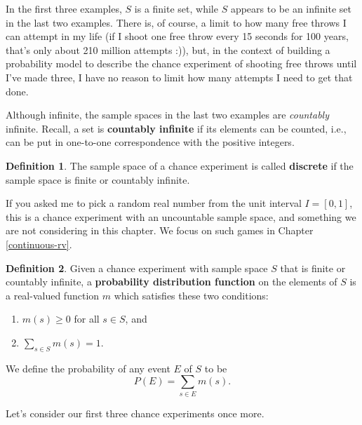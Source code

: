 \documentclass[
]{book}
\providecommand{\tightlist}{%
  \setlength{\itemsep}{0pt}\setlength{\parskip}{0pt}}
\theoremstyle{definition}
\newtheorem{definition}{Definition}[chapter]
\theoremstyle{definition}
\theoremstyle{definition}
\theoremstyle{definition}
\theoremstyle{remark}
\begin{document}
In the first three examples, \(S\) is a finite set, while \(S\) appears to be an infinite set in the last two examples. There is, of course, a limit to how many free throws I can attempt in my life (if I shoot one free throw every 15 seconds for 100 years, that's only about 210 million attempts :)), but, in the context of building a probability model to describe the chance experiment of shooting free throws until I've made three, I have no reason to limit how many attempts I need to get that done.

Although infinite, the sample spaces in the last two examples are \emph{countably} infinite. Recall, a set is \textbf{countably infinite} if its elements can be counted, i.e., can be put in one-to-one correspondence with the positive integers.

\begin{definition}
\protect\hypertarget{def:discrete-sample-space}{}\label{def:discrete-sample-space}The sample space of a chance experiment is called \textbf{discrete} if the sample space is finite or countably infinite.
\end{definition}

If you asked me to pick a random real number from the unit interval \(I = [0,1]\), this is a chance experiment with an uncountable sample space, and something we are not considering in this chapter. We focus on such games in Chapter \ref{continuous-rv}.

\begin{definition}
\protect\hypertarget{def:probability-distribution-function}{}\label{def:probability-distribution-function}Given a chance experiment with sample space \(S\) that is finite or countably infinite, a \textbf{probability distribution function} on the elements of \(S\) is a real-valued function \(m\) which satisfies these two conditions:

\begin{enumerate}
\def\labelenumi{\arabic{enumi}.}
\tightlist
\item
  \(m(s) \geq 0\) for all \(s \in S\), and
\item
  \(\displaystyle \sum_{s \in S} m(s) = 1.\)
\end{enumerate}

We define the probability of any event \(E\) of \(S\) to be \[P(E) = \sum_{s \in E} m(s).\]
\end{definition}

Let's consider our first three chance experiments once more.
\end{document}
